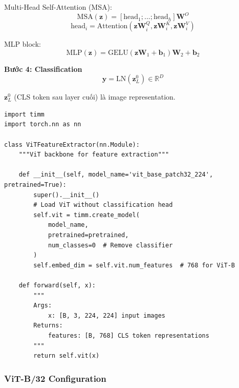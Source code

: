 \documentclass[12pt,a4paper]{article}
\begin{document}
Multi-Head Self-Attention (MSA):
\begin{equation}
    \text{MSA}(\mathbf{z}) = [\text{head}_1; ...; \text{head}_h]\mathbf{W}^O
\end{equation}
\begin{equation}
    \text{head}_i = \text{Attention}(\mathbf{z}\mathbf{W}_i^Q, \mathbf{z}\mathbf{W}_i^K, \mathbf{z}\mathbf{W}_i^V)
\end{equation}

MLP block:
\begin{equation}
    \text{MLP}(\mathbf{z}) = \text{GELU}(\mathbf{z}\mathbf{W}_1 + \mathbf{b}_1)\mathbf{W}_2 + \mathbf{b}_2
\end{equation}

\textbf{Bước 4: Classification}
\begin{equation}
    \mathbf{y} = \text{LN}(\mathbf{z}_L^0) \in \mathbb{R}^D
\end{equation}

$\mathbf{z}_L^0$ (CLS token sau layer cuối) là image representation.

\begin{lstlisting}[caption={ViT Feature Extraction}]
import timm
import torch.nn as nn

class ViTFeatureExtractor(nn.Module):
    """ViT backbone for feature extraction"""
    
    def __init__(self, model_name='vit_base_patch32_224', pretrained=True):
        super().__init__()
        # Load ViT without classification head
        self.vit = timm.create_model(
            model_name, 
            pretrained=pretrained,
            num_classes=0  # Remove classifier
        )
        self.embed_dim = self.vit.num_features  # 768 for ViT-B
        
    def forward(self, x):
        """
        Args:
            x: [B, 3, 224, 224] input images
        Returns:
            features: [B, 768] CLS token representations
        """
        return self.vit(x)
\end{lstlisting}

\subsubsection{ViT-B/32 Configuration}
\end{document}

